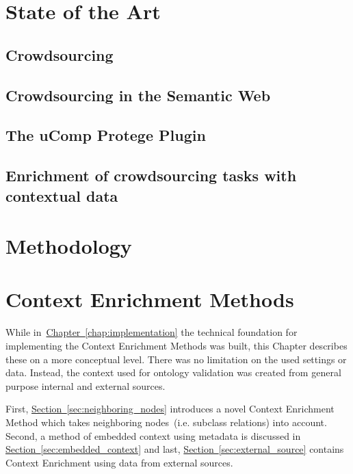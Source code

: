 \documentclass[draft,final]{vutinfth} %
\begin{document}
\chapter{State of the Art}
\section{Crowdsourcing}
\section{Crowdsourcing in the Semantic Web}
\section{The uComp Protege Plugin}
\section{Enrichment of crowdsourcing tasks with contextual data}



\chapter{Methodology}



\chapter{Context Enrichment Methods}\label{chap:context_enrichment_methods}
While in~\hyperref[chap:implementation]{Chapter~\ref*{chap:implementation}} the technical foundation for implementing the Context Enrichment Methods was built, this Chapter describes these on a more conceptual level. There was no limitation on the used settings or data. Instead, the context used for ontology validation was created from general purpose internal and external sources. 

First, \hyperref[sec:neighboring_nodes]{Section~\ref*{sec:neighboring_nodes}} introduces a novel Context Enrichment Method which takes neighboring nodes~(i.e. subclass relations) into account. Second, a method of embedded context using metadata is discussed in \hyperref[sec:embedded_context]{Section~\ref*{sec:embedded_context}} and last, \hyperref[sec:external_source]{Section~\ref*{sec:external_source}} contains Context Enrichment using data from external sources.
\end{document}
